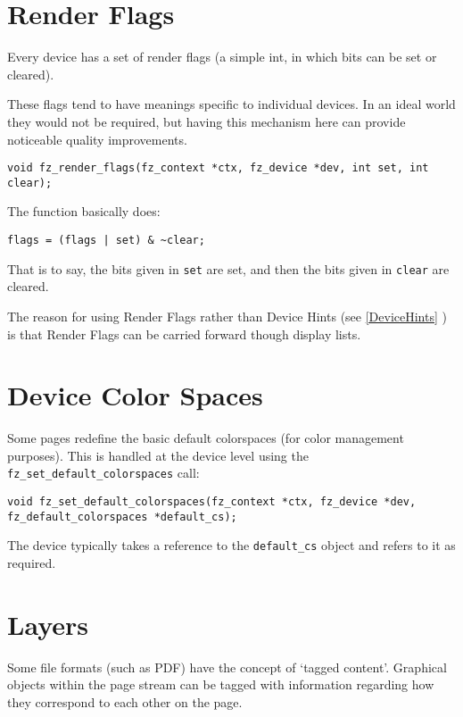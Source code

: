 \documentclass[oneside]{book}
\newcommand{\rjwref}[1] {\autoref{#1} \nameref{#1}}
\begin{document}
\section{Render Flags}

Every device has a set of render flags (a simple int, in which bits can be set or cleared).

These flags tend to have meanings specific to individual devices. In an ideal world they would not be required, but having this mechanism here can provide noticeable quality improvements.

\begin{lstlisting}
void fz_render_flags(fz_context *ctx, fz_device *dev, int set, int clear);
\end{lstlisting}

The function basically does:

\begin{lstlisting}
flags = (flags | set) & ~clear;
\end{lstlisting}

That is to say, the bits given in \texttt{set} are set, and then the bits given in \texttt{clear} are cleared.

The reason for using Render Flags rather than Device Hints (see \rjwref{DeviceHints}) is that Render Flags can be carried forward though display lists.

\section{Device Color Spaces}

Some pages redefine the basic default colorspaces (for color management purposes). This is handled at the device level using the \texttt{fz\_set\_default\_colorspaces} call:

\begin{lstlisting}
void fz_set_default_colorspaces(fz_context *ctx, fz_device *dev, fz_default_colorspaces *default_cs);
\end{lstlisting}

The device typically takes a reference to the \texttt{default\_cs} object and refers to it as required.

\section{Layers}

Some file formats (such as PDF) have the concept of `tagged content'. Graphical objects within the page stream can be tagged with information regarding how they correspond to each other on the page.
\end{document}
